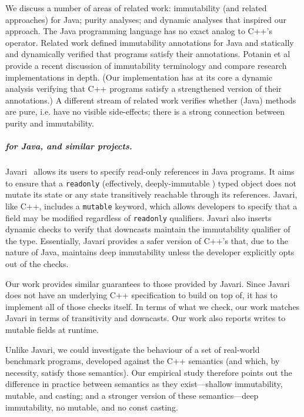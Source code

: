 We discuss a number of areas of related work: immutability (and related
approaches) for Java; purity analyses; and dynamic analyses that inspired our
approach.
The Java programming language has no exact analog to C++'s
\const{} operator.
Related work defined immutability annotations for Java and statically and
dynamically verified that programs satisfy their annotations.
Potanin et al~\cite{lncs-2013-7850-potanin} provide a recent discussion of
immutability terminology and compare research implementations in depth.
(Our implementation has at its core a dynamic analysis verifying that C++ programs
satisfy a strengthened version of their \const{} annotations.)
A different stream of related work verifies whether (Java) methods are pure,
i.e. have no visible side-effects; there is a strong connection between purity
and immutability.

\subparagraph*{\const{} for Java, and similar projects.}

Javari~\cite{meng-tschantz, oopsla-2005-p211-tschantz} allows its users to
specify read-only references in Java programs.
It aims to ensure that a \texttt{readonly} (effectively, deeply-immutable
\const{}) typed object does not mutate its state or any state transitively
reachable through its references.
Javari, like C++, includes a \texttt{mutable} keyword, which allows developers
to specify that a field may be modified regardless of \texttt{readonly}
qualifiers.
Javari also inserts dynamic checks to verify that downcasts maintain the
immutability qualifier of the type.
Essentially, Javari provides a safer version of C++'s \const{} that, due to the
nature of Java, maintains deep immutability unless the developer explicitly opts
out of the checks.

Our work provides similar guarantees to those provided by Javari.
Since Javari does not have an underlying C++ \const{} specification to build on
top of, it has to implement all of those checks itself.
In terms of what we check, our work matches Javari in terms of transitivity and
downcasts.
Our work also reports writes to mutable fields at runtime.

Unlike Javari, we could investigate the behaviour of a set of real-world
benchmark programs, developed against the C++ \const{} semantics (and which, by
necessity, satisfy those semantics).
Our empirical study therefore points out the difference in practice between
\const{} semantics as they exist---shallow immutability, mutable, and
\const{} casting; and a stronger version of these semantics---deep
immutability, no mutable, and no const casting.

